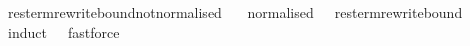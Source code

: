 \ res{\isacharunderscore}term{\isacharunderscore}rewrite{\isacharunderscore}bound{\isacharunderscore}not{\isacharunderscore}normalised{\isacharcolon}\isanewline
\ \ {\isachardoublequoteopen}{\isasymnot}\ normalised\ \ {\isasymLongrightarrow}\ res{\isacharunderscore}term{\isacharunderscore}rewrite{\isacharunderscore}bound\ \ {\isasymnoteq}\ {}{\isachardoublequoteclose}\isanewline
\ \ %
\isamarkupfalse%
\ {\isacharparenleft}induct\ \ {\isacharsemicolon}\ fastforce{\isacharparenright}
